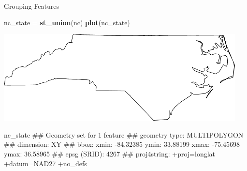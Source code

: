 \documentclass[11pt,ignorenonframetext,]{beamer}
\newenvironment{Shaded}{}{}
\newcommand{\KeywordTok}[1]{\textcolor[rgb]{0.00,0.44,0.13}{\textbf{#1}}}
\newcommand{\StringTok}[1]{\textcolor[rgb]{0.25,0.44,0.63}{#1}}
\newcommand{\NormalTok}[1]{#1}
\let\oldShaded\Shaded
\let\endoldShaded\endShaded
\renewenvironment{Shaded}{\footnotesize\begin{spacing}{0.9}\oldShaded}{\endoldShaded\end{spacing}}
\let\oldverbatim\verbatim
\let\endoldverbatim\endverbatim
\newcommand{\scriptoutput}{
  \renewenvironment{Shaded}{\scriptsize\begin{spacing}{0.9}\oldShaded}{\endoldShaded\end{spacing}}
  \renewenvironment{verbatim}{\scriptsize\begin{spacing}{0.9}\oldverbatim}{\endoldverbatim\end{spacing}}
}
\begin{document}
\begin{frame}[fragile,t]{Grouping Features}

\scriptoutput

\begin{Shaded}
\begin{Highlighting}[]
\NormalTok{nc_state =}\StringTok{ }\KeywordTok{st_union}\NormalTok{(nc)}
\KeywordTok{plot}\NormalTok{(nc_state)}
\end{Highlighting}
\end{Shaded}

\begin{center}\includegraphics[width=0.95\textwidth]{Lec17_files/figure-beamer/unnamed-chunk-20-1} \end{center}

\begin{Shaded}
\begin{Highlighting}[]

\NormalTok{nc_state}
\NormalTok{## Geometry set for 1 feature }
\NormalTok{## geometry type:  MULTIPOLYGON}
\NormalTok{## dimension:      XY}
\NormalTok{## bbox:           xmin: -84.32385 ymin: 33.88199 xmax: -75.45698 ymax: 36.58965}
\NormalTok{## epsg (SRID):    4267}
\NormalTok{## proj4string:    +proj=longlat +datum=NAD27 +no_defs}
\end{Highlighting}
\end{Shaded}

\end{frame}
\end{document}

